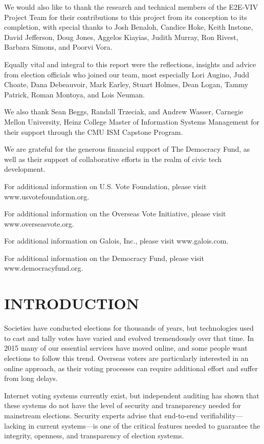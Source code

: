 We would also like to thank the research and technical members of the
E2E-VIV Project Team for their contributions to this project from its 
conception to its completion, with special thanks to Josh Benaloh,
Candice Hoke, Keith Instone, David Jefferson, Doug Jones, Aggelos
Kiayias, Judith Murray, Ron Rivest, Barbara Simons, and Poorvi Vora. 

Equally vital and integral to this report were the reflections,
insights and advice from election officials who joined our team, most
especially Lori Augino, Judd Choate, Dana Debeauvoir, Mark Earley,
Stuart Holmes, Dean Logan, Tammy Patrick, Roman Montoya, and Lois
Neuman.

We also thank Sean Beggs, Randall Trzeciak, and Andrew Wasser,
Carnegie Mellon University, Heinz College Master of Information
Systems Management for their support through the CMU ISM Capstone
Program. 

We are grateful for the generous financial support of The Democracy
Fund, as well as their support of collaborative efforts in the realm
of civic tech development. 

For additional information on U.S. Vote Foundation, please visit
www.usvotefoundation.org.   

For additional information on the Overseas Vote Initiative, please
visit www.overseasvote.org. 

For additional information on Galois, Inc., please visit
www.galois.com.

For additional information on the Democracy Fund, please visit
www.democracyfund.org.  

\newpage

\section*{INTRODUCTION}

Societies have conducted elections for thousands of years, but
technologies used to cast and tally votes have varied and evolved
tremendously over that time. In 2015 many of our essential services
have moved online, and some people want elections to follow this
trend. Overseas voters are particularly interested in an online
approach, as their voting processes can require additional effort and
suffer from long delays.

Internet voting systems currently exist, but independent auditing has
shown that these systems do not have the level of security and
transparency needed for mainstream elections. Security experts advise
that end-to-end verifiability---lacking in current systems---is one of
the critical features needed to guarantee the integrity, openness, and
transparency of election systems.

